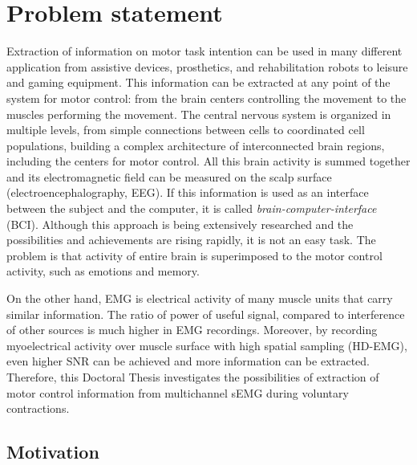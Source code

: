 \chapter{Problem statement}

Extraction of information on motor task intention can be used in many different application from assistive devices, prosthetics, and rehabilitation robots to leisure and gaming equipment. This information can be extracted at any point of the system for motor control: from the brain centers controlling the movement to the muscles performing the movement. The central nervous system is organized in multiple levels, from simple connections between cells to coordinated cell populations, building a complex architecture of interconnected brain regions, including the centers for motor control. All this brain activity is summed together and its electromagnetic field can be measured on the scalp surface (electroencephalography, EEG). If this information is used as an interface between the subject and the computer, it is called \emph{brain-computer-interface} (BCI). Although this approach is being extensively researched and the possibilities and achievements are rising rapidly, it is not an easy task. The problem is that activity of entire brain is superimposed to the motor control activity, such as emotions and memory.

On the other hand, EMG is electrical activity of many muscle units that carry similar information. The ratio of power of useful signal, compared to interference of other sources is much higher in EMG recordings. Moreover, by recording myoelectrical activity over muscle surface with high spatial sampling (HD-EMG), even higher SNR can be achieved and more information can be extracted. Therefore, this Doctoral Thesis investigates the possibilities of extraction of motor control information from multichannel sEMG during voluntary contractions.

    
    
    \section{Motivation}
    

